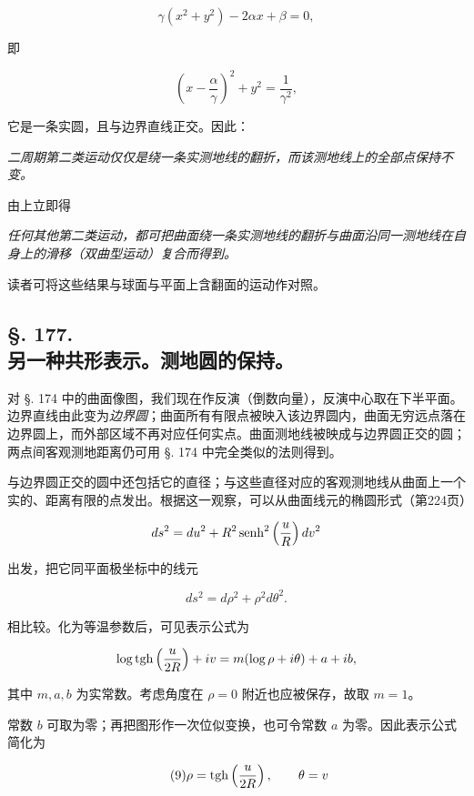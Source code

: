 \[
 \gamma(x^2+y^2)-2\alpha x+\beta=0,
\]

即

\[
 \left(x-\frac{\alpha}{\gamma}\right)^2+y^2=\frac1{\gamma^2},
\]

它是一条实圆，且与边界直线正交。因此：

\emph{二周期第二类运动仅仅是绕一条实测地线的翻折，而该测地线上的全部点保持不变。}



由上立即得

\emph{任何其他第二类运动，都可把曲面绕一条实测地线的翻折与曲面沿同一测地线在自身上的滑移（双曲型运动）复合而得到。}



读者可将这些结果与球面与平面上含翻面的运动作对照。



\subsection*{§. 177.\\ 另一种共形表示。测地圆的保持。}



对 §. 174 中的曲面像图，我们现在作反演（倒数向量），反演中心取在下半平面。边界直线由此变为\emph{边界圆}；曲面所有有限点被映入该边界圆内，曲面无穷远点落在边界圆上，而外部区域不再对应任何实点。曲面测地线被映成与边界圆正交的圆；两点间客观测地距离仍可用 §. 174 中完全类似的法则得到。



与边界圆正交的圆中还包括它的直径；与这些直径对应的客观测地线从曲面上一个实的、距离有限的点发出。根据这一观察，可以从曲面线元的椭圆形式（第224页）

\[
 ds^2=du^2+R^2\operatorname{senh}^2\left(\frac uR\right)dv^2
\]

出发，把它同平面极坐标中的线元

\[
 ds^2=d\rho^2+\rho^2d\theta^2.
\]

相比较。化为等温参数后，可见表示公式为

\[
 \log\operatorname{tgh}\left(\frac u{2R}\right)+iv=m(\log\rho+i\theta)+a+ib,
\]

其中 $m,a,b$ 为实常数。考虑角度在 $\rho=0$ 附近也应被保存，故取 $m=1$。



常数 $b$ 可取为零；再把图形作一次位似变换，也可令常数 $a$ 为零。因此表示公式简化为

\[
\tag{9}
 \rho=\operatorname{tgh}\left(\frac u{2R}\right),\qquad \theta=v
\]

